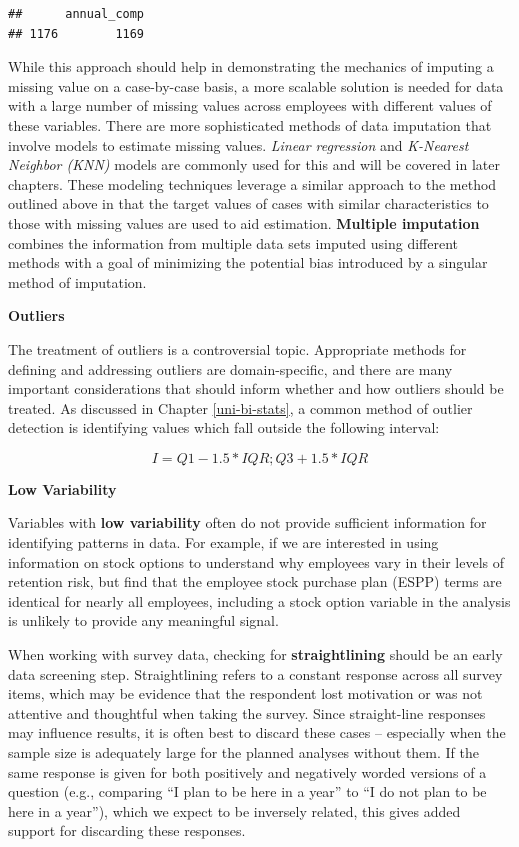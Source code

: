 \documentclass[]{book}
\begin{document}
\begin{verbatim}
##      annual_comp
## 1176        1169
\end{verbatim}

While this approach should help in demonstrating the mechanics of imputing a missing value on a case-by-case basis, a more scalable solution is needed for data with a large number of missing values across employees with different values of these variables. There are more sophisticated methods of data imputation that involve models to estimate missing values. \emph{Linear regression} and \emph{K-Nearest Neighbor (KNN)} models are commonly used for this and will be covered in later chapters. These modeling techniques leverage a similar approach to the method outlined above in that the target values of cases with similar characteristics to those with missing values are used to aid estimation. \textbf{Multiple imputation} combines the information from multiple data sets imputed using different methods with a goal of minimizing the potential bias introduced by a singular method of imputation.

\textbf{Outliers}

The treatment of outliers is a controversial topic. Appropriate methods for defining and addressing outliers are domain-specific, and there are many important considerations that should inform whether and how outliers should be treated. As discussed in Chapter \ref{uni-bi-stats}, a common method of outlier detection is identifying values which fall outside the following interval:

\[I = Q1 - 1.5 * IQR; Q3 + 1.5 * IQR\]

\textbf{Low Variability}

Variables with \textbf{low variability} often do not provide sufficient information for identifying patterns in data. For example, if we are interested in using information on stock options to understand why employees vary in their levels of retention risk, but find that the employee stock purchase plan (ESPP) terms are identical for nearly all employees, including a stock option variable in the analysis is unlikely to provide any meaningful signal.

When working with survey data, checking for \textbf{straightlining} should be an early data screening step. Straightlining refers to a constant response across all survey items, which may be evidence that the respondent lost motivation or was not attentive and thoughtful when taking the survey. Since straight-line responses may influence results, it is often best to discard these cases -- especially when the sample size is adequately large for the planned analyses without them. If the same response is given for both positively and negatively worded versions of a question (e.g., comparing ``I plan to be here in a year'' to ``I do not plan to be here in a year''), which we expect to be inversely related, this gives added support for discarding these responses.
\end{document}
